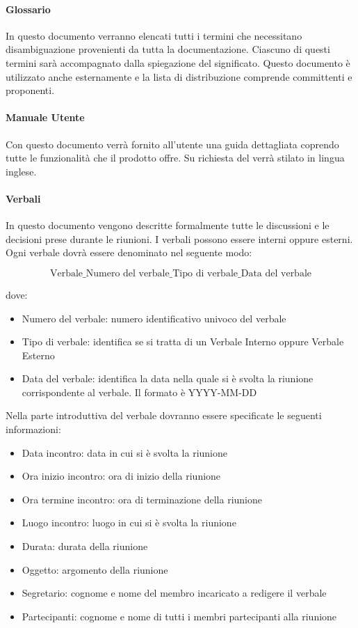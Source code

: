 \paragraph{Glossario  }
In questo documento verranno elencati tutti i termini
che necessitano disambiguazione provenienti da tutta la documentazione.
Ciascuno di questi termini sarà accompagnato dalla spiegazione del
significato. Questo documento è utilizzato anche esternamente e la
lista di distribuzione comprende committenti e proponenti. 

\paragraph{Manuale Utente  }
Con questo documento verrà fornito all'utente una guida dettagliata coprendo tutte le funzionalità che il prodotto offre.
Su richiesta del  verrà stilato in lingua inglese.


\paragraph{Verbali }
In questo documento vengono descritte formalmente tutte le discussioni
e le decisioni prese durante le riunioni. I verbali possono essere
interni oppure esterni. 
Ogni verbale dovrà essere denominato nel seguente modo: 


$$\text{Verbale}\_\text{Numero del verbale}\_\text{Tipo di verbale}\_\text{Data del verbale} $$

dove:
\begin{itemize}
\item Numero del verbale: numero identificativo univoco del verbale
\item Tipo di verbale: identifica se si tratta di un Verbale Interno oppure Verbale Esterno
\item Data del verbale: identifica la data nella quale si è svolta la riunione corrispondente al verbale. Il formato è YYYY-MM-DD  
\end{itemize}


Nella parte introduttiva del verbale dovranno essere specificate le
seguenti informazioni:
\begin{itemize}
\item Data incontro:  data in cui si è svolta la riunione
\item Ora inizio incontro: ora di inizio della riunione
\item Ora termine incontro: ora di terminazione della riunione
\item Luogo incontro: luogo in cui si è svolta la riunione
\item Durata: durata della riunione
\item Oggetto: argomento della riunione
\item Segretario: cognome e nome del membro incaricato a redigere il verbale
\item Partecipanti: cognome e nome di tutti i membri partecipanti alla
  riunione
\end{itemize}

